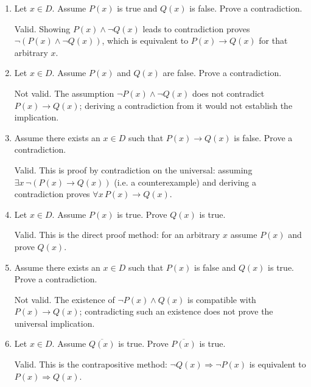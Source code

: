 \begin{enumerate}
\begin{enumerate}[label=\Alph*.]
    \item Let $x \in D$. Assume $P(x)$ is true and $Q(x)$ is false. Prove a contradiction.\\
    \begin{subanswer}
        Valid. Showing $P(x)\land\lnot Q(x)$ leads to contradiction proves $\lnot(P(x)\land\lnot Q(x))$, which is equivalent to $P(x)\rightarrow Q(x)$ for that arbitrary $x$.
    \end{subanswer}

    \item Let $x \in D$. Assume $P(x)$ and $Q(x)$ are false. Prove a contradiction.\\
    \begin{subanswer}
        Not valid. The assumption $\lnot P(x)\land\lnot Q(x)$ does not contradict $P(x)\rightarrow Q(x)$; deriving a contradiction from it would not establish the implication.
    \end{subanswer}

    \item Assume there exists an $x \in D$ such that $P(x) \rightarrow Q(x)$ is false. Prove a contradiction.\\
    \begin{subanswer}
        Valid. This is proof by contradiction on the universal: assuming $\exists x\,\lnot(P(x)\rightarrow Q(x))$ (i.e. a counterexample) and deriving a contradiction proves $\forall x\,P(x)\rightarrow Q(x)$.
    \end{subanswer}

    \item Let $x \in D$. Assume $P(x)$ is true. Prove $Q(x)$ is true.\\
    \begin{subanswer}
        Valid. This is the direct proof method: for an arbitrary $x$ assume $P(x)$ and prove $Q(x)$.
    \end{subanswer}

    \item Assume there exists an $x \in D$ such that $P(x)$ is false and $Q(x)$ is true. Prove a contradiction.\\
    \begin{subanswer}
        Not valid. The existence of $\lnot P(x)\land Q(x)$ is compatible with $P(x)\rightarrow Q(x)$; contradicting such an existence does not prove the universal implication.
    \end{subanswer}

    \item Let $x \in D$. Assume $\overline{Q(x)}$ is true. Prove $\overline{P(x)}$ is true.\\
    \begin{subanswer}
        Valid. This is the contrapositive method: $\lnot Q(x)\Rightarrow\lnot P(x)$ is equivalent to $P(x)\Rightarrow Q(x)$.
    \end{subanswer}


\end{enumerate}
\end{enumerate}
